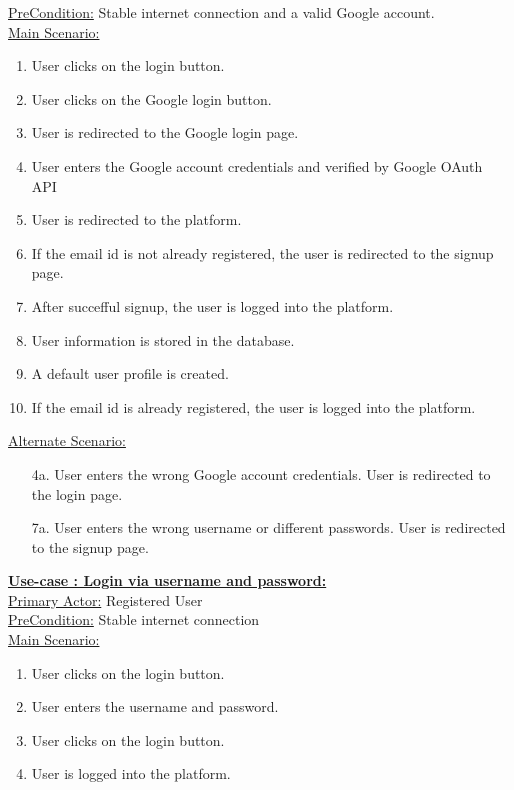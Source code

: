\documentclass[conference,compsoc]{IEEEtran}
\newcounter{UC}
\newcommand{\nextU}{\stepcounter{UC}\theUC}
\begin{document}
\underline{PreCondition:} Stable internet connection and a valid Google account.\\

\underline{Main Scenario:}\\
\begin{enumerate}
    \item User clicks on the login button.
    \item User clicks on the Google login button.
    \item User is redirected to the Google login page.
    \item User enters the Google account credentials and verified by Google OAuth API
    \item User is redirected to the platform.
    \item If the email id is not already registered, the user is redirected to the signup page.
    \item After succefful signup, the user is logged into the platform.
    \item User information is stored in the database.
    \item A default user profile is created.
    \item If the email id is already registered, the user is logged into the platform.
\end{enumerate}

\underline{Alternate Scenario:}\\
\begin{enumerate}
    \item [4a.] User enters the wrong Google account credentials. User is redirected to the login page.
    \item [7a.] User enters the wrong username or different passwords. User is redirected to the signup page.
\end{enumerate}\vspace{0.2cm}
\underline{\textbf{Use-case \nextU: Login via username and password:}}\\

\underline{Primary Actor:} Registered User\\

\underline{PreCondition:} Stable internet connection\\

\underline{Main Scenario:}\\
\begin{enumerate}
    \item User clicks on the login button.
    \item User enters the username and password.
    \item User clicks on the login button.
    \item User is logged into the platform.
\end{enumerate}
\end{document}
